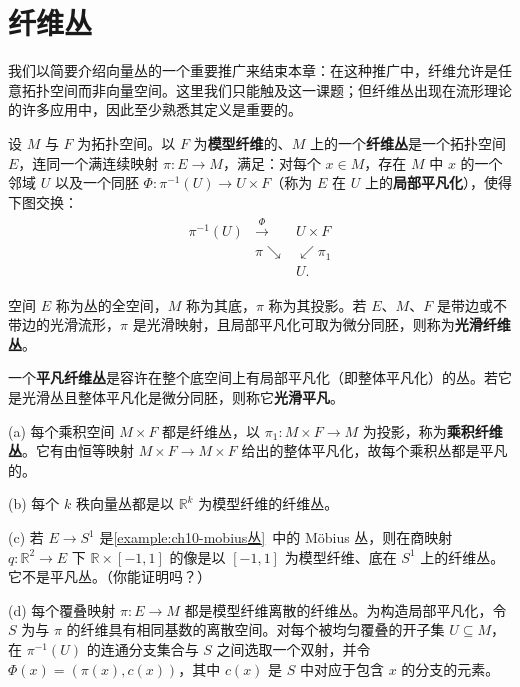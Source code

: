 \documentclass[../../main.tex]{subfiles}
\begin{document}
\section{纤维丛}\label{section:ch10-纤维丛}

我们以简要介绍向量丛的一个重要推广来结束本章：在这种推广中，纤维允许是任意拓扑空间而非向量空间。这里我们只能触及这一课题；但纤维丛出现在流形理论的许多应用中，因此至少熟悉其定义是重要的。

设 $M$ 与 $F$ 为拓扑空间。以 $F$ 为\textbf{模型纤维}的、$M$ 上的一个\textbf{纤维丛}是一个拓扑空间 $E$，连同一个满连续映射 $\pi\colon E\to M$，满足：对每个 $x\in M$，存在 $M$ 中 $x$ 的一个邻域 $U$ 以及一个同胚 $\Phi\colon\pi^{-1}(U)\to U\times F$（称为 $E$ 在 $U$ 上的\textbf{局部平凡化}），使得下图交换：
\begin{align*}
\begin{array}{ccc}
\pi^{-1}(U)&\xrightarrow{\Phi}&U\times F\\
&\pi\searrow&\swarrow\pi_1\\
&&U.
\end{array}
\end{align*}

空间 $E$ 称为丛的全空间，$M$ 称为其底，$\pi$ 称为其投影。若 $E$、$M$、$F$ 是带边或不带边的光滑流形，$\pi$ 是光滑映射，且局部平凡化可取为微分同胚，则称为\textbf{光滑纤维丛}。

一个\textbf{平凡纤维丛}是容许在整个底空间上有局部平凡化（即整体平凡化）的丛。若它是光滑丛且整体平凡化是微分同胚，则称它\textbf{光滑平凡}。

\begin{example}[纤维丛]\label{example:ch10-纤维丛例子}
(a) 每个乘积空间 $M\times F$ 都是纤维丛，以 $\pi_1\colon M\times F\to M$ 为投影，称为\textbf{乘积纤维丛}。它有由恒等映射 $M\times F\to M\times F$ 给出的整体平凡化，故每个乘积丛都是平凡的。

(b) 每个 $k$ 秩向量丛都是以 $\mathbb{R}^k$ 为模型纤维的纤维丛。

(c) 若 $E\to S^1$ 是\cref{example:ch10-mobius丛}~中的 Möbius 丛，则在商映射 $q\colon\mathbb{R}^2\to E$ 下 $\mathbb{R}\times[-1,1]$ 的像是以 $[-1,1]$ 为模型纤维、底在 $S^1$ 上的纤维丛。它不是平凡丛。（你能证明吗？）

(d) 每个覆叠映射 $\pi\colon E\to M$ 都是模型纤维离散的纤维丛。为构造局部平凡化，令 $S$ 为与 $\pi$ 的纤维具有相同基数的离散空间。对每个被均匀覆叠的开子集 $U\subseteq M$，在 $\pi^{-1}(U)$ 的连通分支集合与 $S$ 之间选取一个双射，并令 $\Phi(x)=(\pi(x),c(x))$，其中 $c(x)$ 是 $S$ 中对应于包含 $x$ 的分支的元素。
\end{example}
\end{document}
